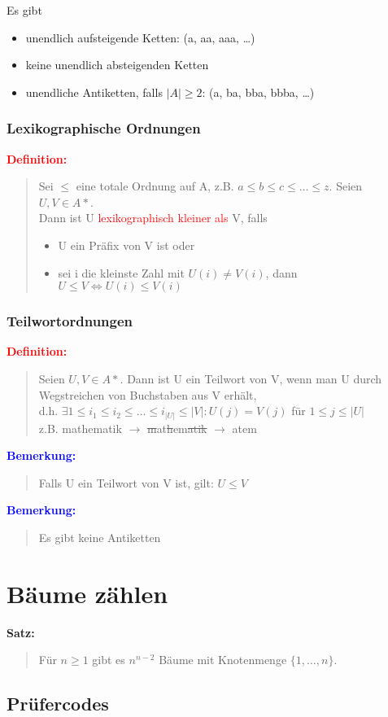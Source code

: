 \documentclass{article}
\newcommand{\red}[1]{\textcolor{red}{#1}}
\newcommand{\blue}[1]{\textcolor{blue}{#1}}
\newcommand{\dgr}[1]{\textcolor{dgr}{#1}}
\newcommand{\de}[1]{\red{\textbf{Definition: }}\begin{quote}#1\end{quote}}
\newcommand{\an}[1]{\blue{\textbf{Bemerkung: }}\begin{quote}#1\end{quote}}
\newcommand{\se}[1]{\dgr{\textbf{Satz: }}\begin{quote}#1\end{quote}}
\begin{document}
Es gibt
\begin{itemize}
    \item unendlich aufsteigende Ketten: (a, aa, aaa, \dots)
    \item keine unendlich absteigenden Ketten
    \item unendliche Antiketten, falls $|A| \ge 2$: (a, ba, bba, bbba, \dots)
\end{itemize}

\subsubsection{Lexikographische Ordnungen}

\de{
    Sei $\le$ eine totale Ordnung auf A, z.B. $a \le b \le c \le \dots \le z$. Seien $U,V \in A*$.\\
    Dann ist U \red{lexikographisch kleiner als} V, falls
    \begin{itemize}
        \item U ein Präfix von V ist oder
        \item sei i die kleinste Zahl mit $U(i) \ne V(i)$, dann $U \le V \iff U(i) \le V(i)$
    \end{itemize}
}

\subsubsection{Teilwortordnungen}

\de{
    Seien $U, V \in A*$. Dann ist U ein Teilwort von V, wenn man U durch Wegstreichen von Buchstaben aus V erhält,\\
    d.h. $\exists 1 \leq i_1 \leq i_2 \leq \dots \leq i_{|U|} \leq |V|: U(j) = V(j)$ für $1 \leq j \leq |U|$\\
    z.B. mathematik $\to$ \sout{m}at\sout{h}em\sout{atik} $\to$ atem
}

\an{
    Falls U ein Teilwort von V ist, gilt: $U \leq V$
}

\an{
    Es gibt keine Antiketten
}

\newpage
\section{Bäume zählen}

\se{
    Für $n \geq 1$ gibt es $n^{n-2}$ Bäume mit Knotenmenge $\{1, \dots, n\}$.
}

\subsection{Prüfercodes}
\end{document}
